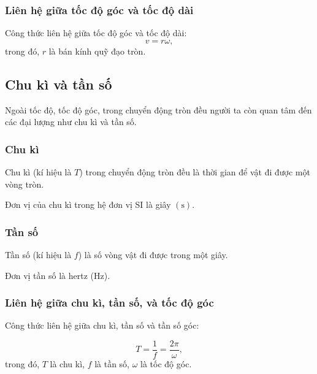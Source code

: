 \subsubsection{Liên hệ giữa tốc độ góc và tốc độ dài}
Công thức liên hệ giữa tốc độ góc và tốc độ dài:
$$v=r\omega,$$ 
trong đó, $r$ là bán kính quỹ đạo tròn.		


\subsection{Chu kì và tần số}
Ngoài tốc độ, tốc độ góc, trong chuyển động tròn đều người ta còn quan tâm đến các đại lượng như chu kì và tần số.

\subsubsection{Chu kì}

Chu kì (kí hiệu là $T$) trong chuyển động tròn đều là thời gian để vật đi được một vòng tròn.

Đơn vị của chu kì trong hệ đơn vị SI là giây $\left(\si{\second}\right)$.

\subsubsection{Tần số}
Tần số (kí hiệu là $f$) là số vòng vật đi được trong một giây.

Đơn vị tần số là hertz (Hz).

\subsubsection{Liên hệ giữa chu kì, tần số, và tốc độ góc}

Công thức liên hệ giữa chu kì, tần số và tần số góc:

$$T=\dfrac{1}{f}=\dfrac{2\pi}{\omega},$$
trong đó, $T$ là chu kì, $f$ là tần số, $\omega$ là tốc độ góc. 				

